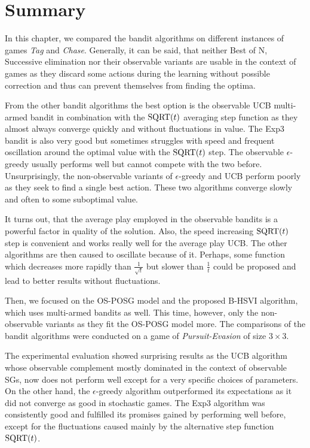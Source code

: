 \documentclass[../main.tex]{subfiles}
\begin{document}
\section{Summary}
In this chapter, we compared the bandit algorithms on different instances of games \textit{Tag} and \textit{Chase}.
Generally, it can be said, that neither Best of N, Successive elimination nor their observable variants are usable in the context of games as they discard some actions during the learning without possible correction and thus can prevent themselves from finding the optima.

From the other bandit algorithms the best option is the observable UCB multi-armed bandit in combination with the $\text{SQRT}(t)$ averaging step function as they almost always converge quickly and without fluctuations in value.
The Exp3 bandit is also very good but sometimes struggles with speed and frequent oscillation around the optimal value with the $\text{SQRT}(t)$ step.
The observable $\epsilon$-greedy usually performs well but cannot compete with the two before.
Unsurprisingly, the non-observable variants of $\epsilon$-greedy and UCB perform poorly as they seek to find a single best action.
These two algorithms converge slowly and often to some suboptimal value.

It turns out, that the average play employed in the observable bandits is a powerful factor in quality of the solution.
Also, the speed increasing $\text{SQRT}(t)$ step is convenient and works really well for the average play UCB.
The other algorithms are then caused to oscillate because of it.
Perhaps, some function which decreases more rapidly than $\frac{1}{\sqrt{t}}$ but slower than $\frac{1}{t}$ could be proposed and lead to better results without fluctuations.

Then, we focused on the OS-POSG model and the proposed B-HSVI algorithm, which uses multi-armed bandits as well.
This time, however, only the non-observable variants as they fit the OS-POSG model more.
The comparisons of the bandit algorithms were conducted on a game of \textit{Pursuit-Evasion} of size $3 \times 3$.

The experimental evaluation showed surprising results as the UCB algorithm whose observable complement mostly dominated in the context of observable SGs, now does not perform well except for a very specific choices of parameters.
On the other hand, the $\epsilon$-greedy algorithm outperformed its expectations as it did not converge as good in stochastic games.
The Exp3 algorithm was consistently good and fulfilled its promises gained by performing well before, except for the fluctuations caused mainly by the alternative step function $\text{SQRT}(t)$.
\end{document}
